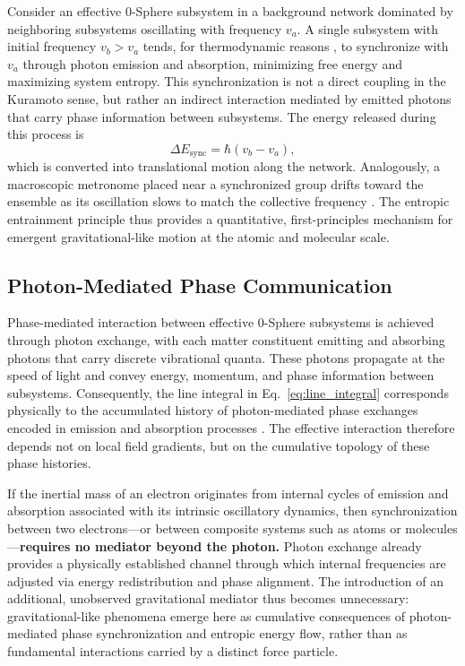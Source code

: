 \documentclass[%
 reprint,
 amsmath,amssymb,
 aps,
 prb,
]{revtex4-2}
\numberwithin{equation}{section}
\begin{document}
Consider an effective 0-Sphere subsystem in a background network dominated by neighboring subsystems oscillating with frequency $v_a$. A single subsystem with initial frequency $v_b > v_a$ tends, for thermodynamic reasons \cite{Jacobson1995,Verlinde2011,Padmanabhan2010,Jaynes2003}, to synchronize with $v_a$ through photon emission and absorption, minimizing free energy and maximizing system entropy. This synchronization is not a direct coupling in the Kuramoto sense, but rather an indirect interaction mediated by emitted photons that carry phase information between subsystems. The energy released during this process is
\begin{equation}
\Delta E_\text{sync} = \hbar (v_b - v_a),
\label{eq:sync_energy}
\end{equation}
which is converted into translational motion along the network. Analogously, a macroscopic metronome placed near a synchronized group drifts toward the ensemble as its oscillation slows to match the collective frequency \cite{Bennett2002}. The entropic entrainment principle thus provides a quantitative, first-principles mechanism for emergent gravitational-like motion at the atomic and molecular scale.

\subsection{Photon-Mediated Phase Communication}

Phase-mediated interaction between effective 0-Sphere subsystems is achieved through photon exchange, with each matter constituent emitting and absorbing photons that carry discrete vibrational quanta. These photons propagate at the speed of light and convey energy, momentum, and phase information between subsystems. Consequently, the line integral in Eq.~\eqref{eq:line_integral} corresponds physically to the accumulated history of photon-mediated phase exchanges encoded in emission and absorption processes \cite{Hanamura2026Trilogy3}. The effective interaction therefore depends not on local field gradients, but on the cumulative topology of these phase histories.

If the inertial mass of an electron originates from internal cycles of emission and absorption associated with its intrinsic oscillatory dynamics, then synchronization between two electrons—or between composite systems such as atoms or molecules—\textbf{requires no mediator beyond the photon.} Photon exchange already provides a physically established channel through which internal frequencies are adjusted via energy redistribution and phase alignment. The introduction of an additional, unobserved gravitational mediator thus becomes unnecessary: gravitational-like phenomena emerge here as cumulative consequences of photon-mediated phase synchronization and entropic energy flow, rather than as fundamental interactions carried by a distinct force particle.
\end{document}
